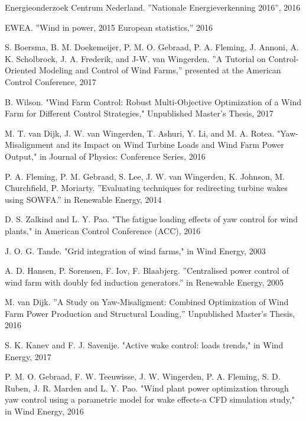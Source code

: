 \begin{thebibliography}{99} %

Energieonderzoek Centrum Nederland. ''Nationale Energieverkenning 2016'', 2016

EWEA. ''Wind in power, 2015 European statistics,'' 2016

S. Boersma, B. M. Doekemeijer, P. M. O. Gebraad, P. A. Fleming, J. Annoni,
A. K. Scholbrock, J. A. Frederik, and J-W. van Wingerden. ''A Tutorial on Control-Oriented Modeling and Control of Wind Farms,''
presented at the American Control Conference, 2017

B. Wilson. "Wind Farm Control: Robust Multi-Objective Optimization of a Wind Farm for Different Control Strategies," Unpublished Master's Thesis, 2017

M. T. van Dijk, J. W. van Wingerden, T. Ashuri, Y. Li, and M. A. Rotea. "Yaw-Misalignment and its Impact on Wind Turbine Loads and Wind Farm Power Output," in Journal of Physics: Conference Series, 2016

P. A. Fleming, P. M. Gebraad, S. Lee, J. W. van Wingerden, K. Johnson, M. Churchfield, P. Moriarty. ''Evaluating techniques for redirecting turbine wakes using SOWFA.'' in Renewable Energy, 2014

D. S. Zalkind and L. Y. Pao. "The fatigue loading effects of yaw control for wind plants," in American Control Conference (ACC), 2016

J. O. G. Tande. "Grid integration of wind farms," in Wind Energy, 2003

A. D. Hansen, P. Sorensen, F. Iov, F. Blaabjerg. ''Centralised power control of wind farm with doubly fed induction generators.'' in Renewable Energy, 2005

M. van Dijk. ''A Study on Yaw-Misaligment: Combined Optimization of Wind Farm Power Production and Structural Loading,'' Unpublished Master's Thesis, 2016

S. K. Kanev and F. J. Savenije. "Active wake control: loads trends," in Wind Energy, 2017

P. M. O. Gebraad, F. W. Teeuwisse, J. W. Wingerden, P. A. Fleming, S. D. Ruben, J. R. Marden and L. Y. Pao. "Wind plant power optimization through yaw control using a parametric model for wake effects-a CFD simulation study," in Wind Energy, 2016


\end{thebibliography}
